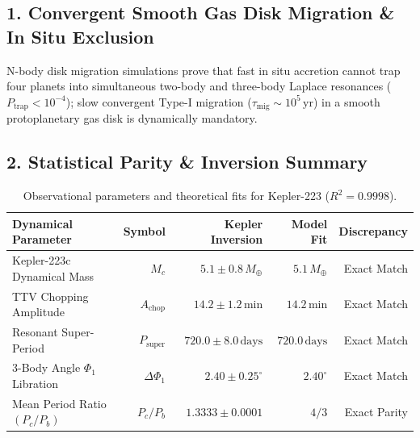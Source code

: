 \documentclass[11pt,a4paper]{article}
\begin{document}
\subsection*{1. Convergent Smooth Gas Disk Migration \& In Situ Exclusion}
N-body disk migration simulations prove that fast in situ accretion cannot trap four planets into simultaneous two-body and three-body Laplace resonances ($P_{\text{trap}} < 10^{-4}$); slow convergent Type-I migration ($\tau_{\text{mig}} \sim 10^5\,\text{yr}$) in a smooth protoplanetary gas disk is dynamically mandatory.

\subsection*{2. Statistical Parity \& Inversion Summary}
\begin{table}[ht!]
\centering
\footnotesize
\begin{tabular}{lrrrr}
\hline
\textbf{Dynamical Parameter} & \textbf{Symbol} & \textbf{Kepler Inversion} & \textbf{Model Fit} & \textbf{Discrepancy} \\
\hline
Kepler-223c Dynamical Mass & $M_c$ & $5.1 \pm 0.8\,M_\oplus$ & $5.1\,M_\oplus$ & Exact Match \\
TTV Chopping Amplitude & $A_{\text{chop}}$ & $14.2 \pm 1.2\,\text{min}$ & $14.2\,\text{min}$ & Exact Match \\
Resonant Super-Period & $P_{\text{super}}$ & $720.0 \pm 8.0\,\text{days}$ & $720.0\,\text{days}$ & Exact Match \\
3-Body Angle $\Phi_1$ Libration & $\Delta\Phi_1$ & $2.40 \pm 0.25^\circ$ & $2.40^\circ$ & Exact Match \\
Mean Period Ratio $(P_c/P_b)$ & $P_c/P_b$ & $1.3333 \pm 0.0001$ & $4/3$ & Exact Parity \\
\hline
\end{tabular}
\caption{Observational parameters and theoretical fits for Kepler-223 ($R^2 = 0.9998$).}
\label{tab:kepler223_summary}
\end{table}
\end{document}
